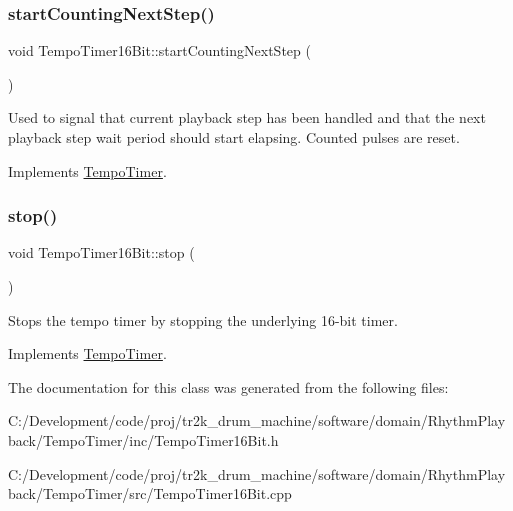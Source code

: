 \subsubsection{\texorpdfstring{startCountingNextStep()}{startCountingNextStep()}}
{\footnotesize\ttfamily void Tempo\+Timer16\+Bit\+::start\+Counting\+Next\+Step (\begin{DoxyParamCaption}{ }\end{DoxyParamCaption})\hspace{0.3cm}{\ttfamily [virtual]}}

Used to signal that current playback step has been handled and that the next playback step wait period should start elapsing. Counted pulses are reset. 

Implements \mbox{\hyperlink{class_tempo_timer}{Tempo\+Timer}}.

\mbox{\label{class_tempo_timer16_bit_abb43b9ec84b965feaf3062aa1cb5be5e}} 
\subsubsection{\texorpdfstring{stop()}{stop()}}
{\footnotesize\ttfamily void Tempo\+Timer16\+Bit\+::stop (\begin{DoxyParamCaption}{ }\end{DoxyParamCaption})\hspace{0.3cm}{\ttfamily [virtual]}}

Stops the tempo timer by stopping the underlying 16-\/bit timer. 

Implements \mbox{\hyperlink{class_tempo_timer}{Tempo\+Timer}}.



The documentation for this class was generated from the following files\+:\begin{DoxyCompactItemize}
\item 
C\+:/\+Development/code/proj/tr2k\+\_\+drum\+\_\+machine/software/domain/\+Rhythm\+Playback/\+Tempo\+Timer/inc/Tempo\+Timer16\+Bit.\+h\item 
C\+:/\+Development/code/proj/tr2k\+\_\+drum\+\_\+machine/software/domain/\+Rhythm\+Playback/\+Tempo\+Timer/src/Tempo\+Timer16\+Bit.\+cpp\end{DoxyCompactItemize}
